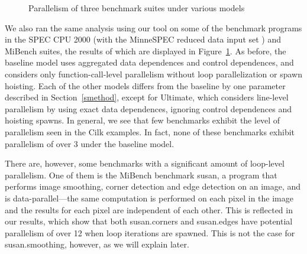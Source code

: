 \begin{figure}
 \centering

\caption{Parallelism of three benchmark suites under various models}
\label{benchmarks}
\end{figure}

We also ran the same analysis using our tool on some of the benchmark programs in the SPEC CPU 2000 (with the MinneSPEC reduced data input set \cite{KleinOsowski02minnespec}) and MiBench suites, the results of which are displayed in Figure~\ref{benchmarks}.
As before, the baseline model uses aggregated data dependences and control dependences, and considers only function-call-level parallelism without loop parallelization or spawn hoisting.
Each of the other models differs from the baseline by one parameter described in Section~\ref{smethod}, except for \textsf{Ultimate}, which considers line-level parallelism by using exact data dependences, ignoring control dependences and hoisting spawns.
In general, we see that few benchmarks exhibit the level of parallelism seen in the Cilk examples.
In fact, none of these benchmarks exhibit parallelism of over 3 under the baseline model.

There are, however, some benchmarks with a significant amount of loop-level parallelism.
One of them is the MiBench benchmark \textsf{susan}, a program that performs image smoothing, corner detection and edge detection on an image, and is data-parallel---the same computation is performed on each pixel in the image and the results for each pixel are independent of each other.
This is reflected in our results, which show that both \textsf{susan.corners} and \textsf{susan.edges} have potential parallelism of over 12 when loop iterations are spawned.
This is not the case for \textsf{susan.smoothing}, however, as we will explain later.

